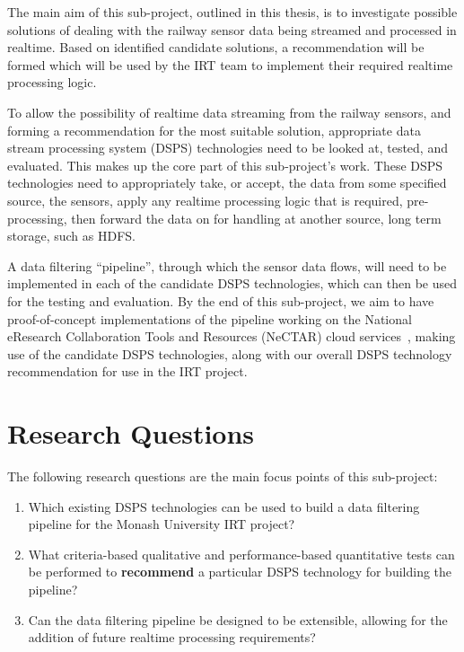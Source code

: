 The main aim of this sub-project, outlined in this thesis, is to investigate possible solutions of dealing with the railway sensor data being
streamed and processed in realtime. Based on identified candidate solutions, a recommendation will be formed which will be
used by the IRT team to implement their required realtime processing logic.

To allow the possibility of realtime data streaming from the railway sensors, and forming a recommendation for the most
suitable solution, appropriate data stream processing system
(DSPS) technologies need to be looked at, tested, and evaluated. This makes up the core part of this sub-project's work.
These DSPS technologies need to appropriately take, or accept, the data from some specified source, \eg the sensors, apply
any realtime processing logic that is required, \eg pre-processing, then forward the data on for handling at
another source, \eg long term storage, such as HDFS.

A data filtering ``pipeline'', through which the sensor data flows, will need to be implemented in each of the candidate
DSPS technologies, which can then be used for the testing and evaluation.
By the end of this sub-project, we aim to have proof-of-concept implementations of the pipeline working on the National
eResearch Collaboration Tools and Resources (NeCTAR) cloud services~\cite{web:Nectar}, making use of the candidate DSPS
technologies, along with our overall DSPS technology recommendation for use in the IRT project.




\section{Research Questions} %
\label{sub:research_questions}

The following research questions are the main focus points of this sub-project:

\begin{enumerate}
  \item\label{item:dsps} Which existing DSPS technologies can be used to build a data filtering pipeline for the Monash
  University IRT project?
  \item\label{item:pipeline} What criteria-based qualitative and performance-based quantitative tests can be performed
  to \textbf{recommend} a particular DSPS technology for building the pipeline?
  \item\label{item:recommendations} Can the data filtering pipeline be designed to be extensible, allowing for the
  addition of future realtime processing requirements?
\end{enumerate}

